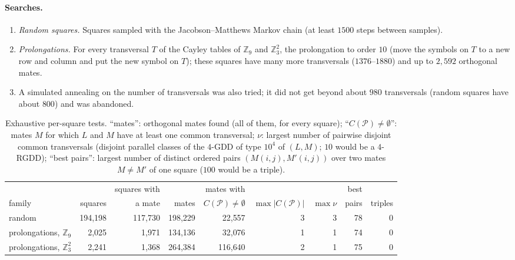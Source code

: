 \documentclass[11pt]{article}
\theoremstyle{remark}
\newcommand{\Z}{\mathbb{Z}}
\begin{document}
\paragraph{Searches.}
\begin{enumerate}
\item \emph{Random squares.}  Squares sampled with the Jacobson--Matthews Markov chain
  \cite{JM96} (at least $1500$ steps between samples).
\item \emph{Prolongations.}  For every transversal $T$ of the Cayley tables of $\Z_9$ and
  $\Z_3^{2}$, the prolongation to order $10$ (move the symbols on $T$ to a new row and
  column and put the new symbol on $T$); these squares have many more transversals
  ($1376$--$1880$) and up to $2{,}592$ orthogonal mates.
\item A simulated annealing on the number of transversals was also tried; it did not get
  beyond about $980$ transversals (random squares have about $800$) and was abandoned.
\end{enumerate}

\begin{table}[ht]
\centering
\small
\setlength{\tabcolsep}{4pt}
\begin{tabular}{lrrrrrrrr}
\toprule
 & & squares with & & mates with & & & best & \\
family & squares & a mate & mates & $C(\mathcal P)\ne\emptyset$ & $\max|C(\mathcal P)|$ & $\max\nu$ & pairs & triples\\
\midrule
random & 194{,}198 & 117{,}730 & 198{,}229 & 22{,}557 & 3 & 3 & 78 & 0\\
prolongations, $\Z_9$ & 2{,}025 & 1{,}971 & 134{,}136 & 32{,}076 & 1 & 1 & 74 & 0\\
prolongations, $\Z_3^{2}$ & 2{,}241 & 1{,}368 & 264{,}384 & 116{,}640 & 2 & 1 & 75 & 0\\
\bottomrule
\end{tabular}
\caption{Exhaustive per-square tests.  ``mates'': orthogonal mates found (all of them, for every square); ``$C(\mathcal P)\ne\emptyset$'': mates $M$ for which $L$ and $M$ have at least one common transversal; $\nu$: largest number of pairwise disjoint common transversals (disjoint parallel classes of the $4$-GDD of type $10^{4}$ of $(L,M)$; $10$ would be a $4$-RGDD); ``best pairs'': largest number of distinct ordered pairs $(M(i,j),M'(i,j))$ over two mates $M\ne M'$ of one square ($100$ would be a triple).}
\label{tab:results}
\end{table}
\end{document}
